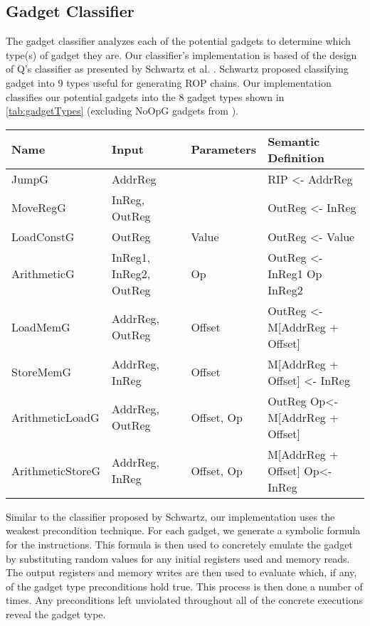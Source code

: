 \documentclass[journal]{IEEEtran}
\begin{document}
\subsection{Gadget Classifier}
The gadget classifier analyzes each of the potential gadgets to determine which type(s) of gadget they are.
Our classifier's implementation is based of the design of Q's classifier as presented by Schwartz et al. \cite{schwartz2011q}.
Schwartz proposed classifying gadget into 9 types useful for generating ROP chains.
Our implementation classifies our potential gadgets into the 8 gadget types shown in \ref{tab:gadgetTypes} (excluding NoOpG gadgets from \cite{schwartz2011q}).

\begin{table*}
  \begin{center}
    \begin{tabular}{ | l | l | l | l | }
    \hline
    Name & Input & Parameters & Semantic Definition \\
    \hline
    JumpG & AddrReg & & RIP <- AddrReg \\
    MoveRegG & InReg, OutReg & & OutReg <- InReg \\
    LoadConstG & OutReg & Value & OutReg <- Value \\
    ArithmeticG & InReg1, InReg2, OutReg & Op & OutReg <- InReg1 Op InReg2 \\
    LoadMemG & AddrReg, OutReg & Offset & OutReg <- M[AddrReg + Offset] \\
    StoreMemG & AddrReg, InReg & Offset & M[AddrReg + Offset] <- InReg \\
    ArithmeticLoadG & AddrReg, OutReg & Offset, Op & OutReg Op<-  M[AddrReg + Offset] \\
    ArithmeticStoreG & AddrReg, InReg & Offset, Op & M[AddrReg + Offset] Op<- InReg \\

      \hline
    \end{tabular}
    \label{tab:gadgetTypes}
    \caption{Gadget Types}
  \end{center}
\end{table*}

Similar to the classifier proposed by Schwartz, our implementation uses the weakest precondition technique.
For each gadget, we generate a symbolic formula for the instructions.
This formula is then used to concretely emulate the gadget by substituting random values for any initial registers used and memory reads.
The output registers and memory writes are then used to evaluate which, if any, of the gadget type preconditions hold true.
This process is then done a number of times.
Any preconditions left unviolated throughout all of the concrete executions reveal the gadget type.
\end{document}
